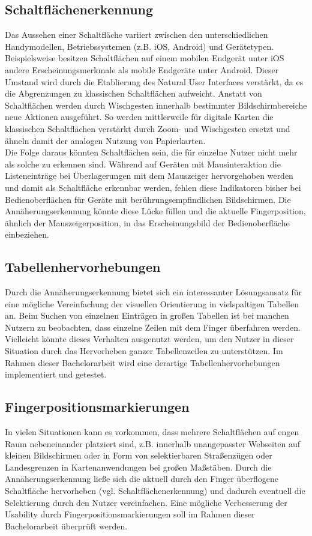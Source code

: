 \documentclass[a4paper,12pt,bibliography=totoc]{scrreprt}%
\begin{document}
\subsection{Schaltflächenerkennung}
Das Aussehen einer Schaltfläche variiert zwischen den unterschiedlichen Handymodellen, Betriebssystemen (z.B. iOS, Android) und Gerätetypen. Beispielsweise besitzen Schaltflächen auf einem mobilen Endgerät unter iOS andere Erscheinungsmerkmale als mobile Endgeräte unter Android. Dieser Umstand wird durch die Etablierung des Natural User Interfaces \cite{nui} verstärkt, da es die Abgrenzungen zu klassischen Schaltflächen aufweicht. Anstatt von Schaltflächen werden durch Wischgesten innerhalb bestimmter Bildschirmbereiche neue Aktionen ausgeführt. So werden mittlerweile für digitale Karten die klassischen Schaltflächen verstärkt durch Zoom- und Wischgesten ersetzt und ähneln damit der analogen Nutzung von Papierkarten.\\
Die Folge daraus könnten Schaltflächen sein, die für einzelne Nutzer nicht mehr als solche zu erkennen sind. Während auf Geräten mit Mausinteraktion die Listeneinträge bei Überlagerungen mit dem Mauszeiger hervorgehoben werden und damit als Schaltfläche erkennbar werden, fehlen diese Indikatoren bisher bei Bedienoberflächen für Geräte mit berührungsempfindlichen Bildschirmen. Die Annäherungserkennung könnte diese Lücke füllen und die aktuelle Fingerposition, ähnlich der Mauszeigerposition, in das Erscheinungsbild der Bedienoberfläche einbeziehen.

\subsection{Tabellenhervorhebungen}
Durch die Annäherungserkennung bietet sich ein interessanter Lösungsansatz für eine mögliche Vereinfachung der visuellen Orientierung in vielspaltigen Tabellen an. Beim Suchen von einzelnen Einträgen in großen Tabellen ist bei manchen Nutzern zu beobachten, dass einzelne Zeilen mit dem Finger überfahren werden. Vielleicht könnte dieses Verhalten ausgenutzt werden, um den Nutzer in dieser Situation durch das Hervorheben ganzer Tabellenzeilen zu unterstützen. Im Rahmen dieser Bachelorarbeit wird eine derartige Tabellenhervorhebungen implementiert und getestet.

\subsection{Fingerpositionsmarkierungen}
In vielen Situationen kann es vorkommen, dass mehrere Schaltflächen auf engen Raum nebeneinander platziert sind, z.B. innerhalb unangepasster Webseiten auf kleinen Bildschirmen oder in Form von selektierbaren Straßenzügen oder Landesgrenzen in Kartenanwendungen bei großen Maßstäben. Durch die Annäherungserkennung ließe sich die aktuell durch den Finger überflogene Schaltfläche hervorheben (vgl. Schaltflächenerkennung) und dadurch eventuell die Selektierung durch den Nutzer vereinfachen. Eine mögliche Verbesserung der Usability durch Fingerpositionsmarkierungen soll im Rahmen dieser Bachelorarbeit überprüft werden.
\end{document}
